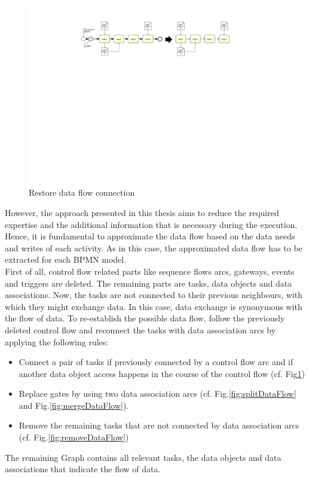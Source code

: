 \begin{figure}[h!]
	\centering
	\includegraphics[width=\textwidth, trim={7.5cm 15cm 7cm 2cm}]{img/ExtractDFDRestore.pdf}
	\caption{Restore data flow connection}
	\label{fig:restoreDataFlow}
\end{figure}

\noindent
However, the approach presented in this thesis aims to reduce the required expertise and the additional information that is necessary during the execution. 
Hence, it is fundamental to approximate the data flow based on the data needs and writes of each activity. As in this case, the approximated data flow has to be extracted for each BPMN model. \\
First of all, control flow related parts like sequence flows arcs, gateways, events and triggers are deleted. The remaining parts are tasks, data objects and data associations. Now, the tasks are not connected to their previous neighbours, with which they might exchange data. In this case, data exchange is synonymous with the flow of data.
To re-establish the possible data flow, follow the previously deleted control flow and reconnect the tasks with data association arcs by applying the following rules:

\begin{itemize}
	\item Connect a pair of tasks if previously connected by a control flow arc and 
	if another data object access happens in the course of the control flow (cf. Fig\ref{fig:restoreDataFlow})
	\item Replace gates by using two data association arcs (cf. Fig.\ref{fig:splitDataFlow} and Fig.\ref{fig:mergeDataFlow}). 
	\item Remove the remaining tasks that are not connected by data association arcs (cf. Fig.\ref{fig:removeDataFlow})
	
\end{itemize}
The remaining Graph contains all relevant tasks, the data objects and data associations that indicate the flow of data.



